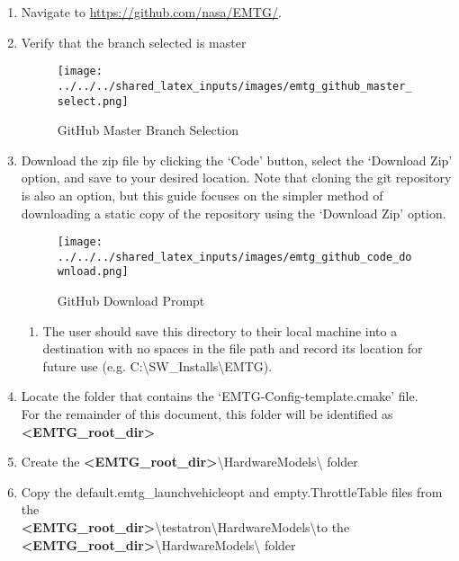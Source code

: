 
\begin{enumerate}
	\item Navigate to \url{https://github.com/nasa/EMTG/}.
	\item Verify that the branch selected is master
		\begin{figure}[H]
			\centering
			\texttt{[image: ../../../shared\_latex\_inputs/images/emtg\_github\_master\_select.png]}
			\caption{GitHub Master Branch Selection}
		\end{figure}
	\item Download the zip file by clicking the ‘Code’ button, select the ‘Download Zip’ option, and save to your desired location. Note that cloning the git repository is also an option, but this guide focuses on the simpler method of downloading a static copy of the repository using the `Download Zip' option. 
		\begin{figure}[H]
			\centering
			\texttt{[image: ../../../shared\_latex\_inputs/images/emtg\_github\_code\_download.png]}
			\caption{GitHub Download Prompt}
		\end{figure}
	\begin{enumerate}
		\item The user should save this directory to their local machine into a destination with no spaces in the file path and record its location for future use (e.g. C:\textbackslash SW\_Installs\textbackslash EMTG).
	\end{enumerate}
	\item Locate the folder that contains the ‘EMTG-Config-template.cmake’ file. \\ For the remainder of this document, this folder will be identified as \textbf{\textless EMTG\_root\_dir\textgreater}	
	\item Create the \textbf{\textless EMTG\_root\_dir\textgreater}\textbackslash HardwareModels\textbackslash \hspace{1pt} folder
	\item Copy the default.emtg\_launchvehicleopt and empty.ThrottleTable files from the \\ \textbf{\textless EMTG\_root\_dir\textgreater}\textbackslash testatron\textbackslash HardwareModels\textbackslash to the \\ \textbf{\textless EMTG\_root\_dir\textgreater}\textbackslash HardwareModels\textbackslash \hspace{1pt} folder

\end{enumerate}
